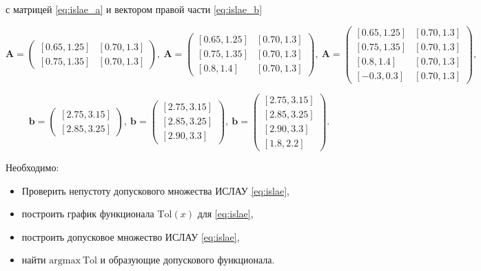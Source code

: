 \documentclass{article}
\begin{document}
  с матрицей \ref{eq:islae_a} и вектором правой части \ref{eq:islae_b}

  \begin{equation} \label{eq:islae_a}
    \mathbf{A} = \begin{pmatrix}
      [0.65, 1.25] & [0.70, 1.3] \\
      [0.75, 1.35] & [0.70, 1.3]
    \end{pmatrix},
    ~
    \mathbf{A} = \begin{pmatrix}
      [0.65, 1.25] & [0.70, 1.3] \\
      [0.75, 1.35] & [0.70, 1.3] \\
      [0.8, 1.4] & [0.70, 1.3]
    \end{pmatrix},
    ~
    \mathbf{A} = \begin{pmatrix}
      [0.65, 1.25] & [0.70, 1.3] \\
      [0.75, 1.35] & [0.70, 1.3] \\
      [0.8, 1.4] & [0.70, 1.3] \\
      [-0.3, 0.3] & [0.70, 1.3]
    \end{pmatrix},
  \end{equation}

  \begin{equation} \label{eq:islae_b}
    \mathbf{b} = \begin{pmatrix}
      [2.75, 3.15] \\
      [2.85, 3.25]
    \end{pmatrix},
    ~
    \mathbf{b} = \begin{pmatrix}
      [2.75, 3.15] \\
      [2.85, 3.25] \\
      [2.90, 3.3]
    \end{pmatrix},
    ~
    \mathbf{b} = \begin{pmatrix}
      [2.75, 3.15] \\
      [2.85, 3.25] \\
      [2.90, 3.3] \\
      [1.8, 2.2]
    \end{pmatrix}.
  \end{equation}

  Необходимо:

  \begin{itemize}
    \item Проверить непустоту допускового множества ИСЛАУ \ref{eq:islae},
    \item построить график функционала \( \text{Tol}(x) \) для \ref{eq:islae},
    \item построить допусковое множество ИСЛАУ \ref{eq:islae},
    \item найти \( \text{argmax} \ \text{Tol} \) и образующие допускового
      функционала.
  \end{itemize}
\end{document}
